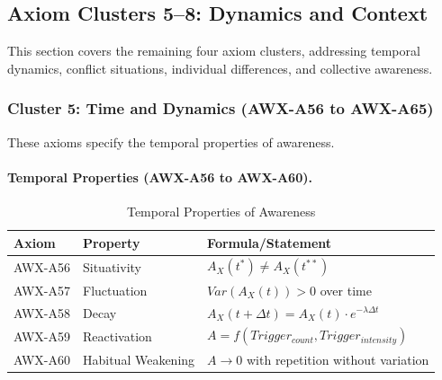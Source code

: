 \subsection{Axiom Clusters 5--8: Dynamics and Context}
\label{subsec:11-8-axioms-5-8}


This section covers the remaining four axiom clusters, addressing temporal
dynamics, conflict situations, individual differences, and collective awareness.

\subsubsection{Cluster 5: Time and Dynamics (AWX-A56 to AWX-A65)}

These axioms specify the temporal properties of awareness.

\paragraph{Temporal Properties (AWX-A56 to AWX-A60).}

\begin{table}[htbp]
\centering
\caption{Temporal Properties of Awareness}
\label{tab:temporal-properties}
\renewcommand{\arraystretch}{1.3}
\begin{tabular}{@{}llp{5.5cm}@{}}
\toprule
\textbf{Axiom} & \textbf{Property} & \textbf{Formula/Statement} \\
\midrule
AWX-A56 & Situativity & $A_X(t^*) \neq A_X(t^{**})$ \\
AWX-A57 & Fluctuation & $Var(A_X(t)) > 0$ over time \\
AWX-A58 & Decay & $A_X(t + \Delta t) = A_X(t) \cdot e^{-\lambda \Delta t}$ \\
AWX-A59 & Reactivation & $A = f(Trigger_{count}, Trigger_{intensity})$ \\
AWX-A60 & Habitual Weakening & $A \rightarrow 0$ with repetition without variation \\
\bottomrule
\end{tabular}
\end{table}


